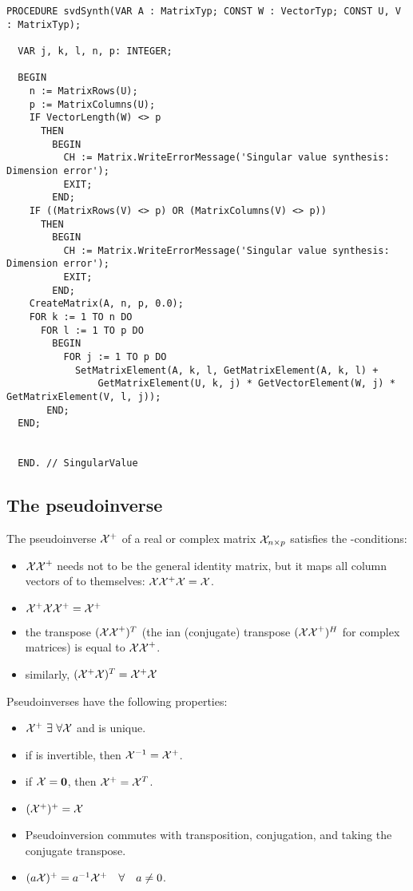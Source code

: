 \begin{lstlisting}[caption={Singular value synthesis}]
  PROCEDURE svdSynth(VAR A : MatrixTyp; CONST W : VectorTyp; CONST U, V : MatrixTyp);

  VAR j, k, l, n, p: INTEGER;

  BEGIN
    n := MatrixRows(U);
    p := MatrixColumns(U);
    IF VectorLength(W) <> p
      THEN
        BEGIN
          CH := Matrix.WriteErrorMessage('Singular value synthesis: Dimension error');
          EXIT;
        END;
    IF ((MatrixRows(V) <> p) OR (MatrixColumns(V) <> p))
      THEN
        BEGIN
          CH := Matrix.WriteErrorMessage('Singular value synthesis: Dimension error');
          EXIT;
        END;
    CreateMatrix(A, n, p, 0.0);
    FOR k := 1 TO n DO
      FOR l := 1 TO p DO
        BEGIN
          FOR j := 1 TO p DO
            SetMatrixElement(A, k, l, GetMatrixElement(A, k, l) +
                GetMatrixElement(U, k, j) * GetVectorElement(W, j) * GetMatrixElement(V, l, j));
       END;
  END;


  END. // SingularValue
\end{lstlisting}

\subsection{The  pseudoinverse}\label{text:pseudoinv}

The pseudoinverse \(\mathcal{X}^+ \) of a real or complex matrix \(\mathcal{X}_{n\times p} \) satisfies the -conditions:
\begin{itemize}
  \item{\( \mathcal{XX}^+ \) needs not to be the general identity matrix, but it maps all column vectors of  to themselves: \(\mathcal{X} \mathcal{X}^+ \mathcal{X} = \mathcal{X} \).}
  \item{\( \mathcal{X}^+ \mathcal{X} \mathcal{X}^+ = \mathcal{X}^+ \)}
  \item{the transpose \((\mathcal{XX}^+)^T \) (the ian (conjugate) transpose \((\mathcal{XX}^+)^H \) for complex matrices) is equal to \(\mathcal{XX}^+ \).}
  \item{similarly, \((\mathcal{X}^+\mathcal{X})^T = \mathcal{X}^+\mathcal{X} \)}
\end{itemize}
Pseudoinverses have the following properties:
\begin{itemize}
  \item{\( \mathcal{X}^+ \ \exists \ \forall \mathcal{X} \) and is unique.}
  \item{if  is invertible, then \(\mathcal{X}^{-1} = \mathcal{X}^+ \). }
  \item{if \(\mathcal{X} = \mathbf{0} \), then \(\mathcal{X}^+ = \mathcal{X}^T \). }
  \item{\( (\mathcal{X}^+)^+ = \mathcal{X} \)}
  \item{Pseudoinversion commutes with transposition, conjugation, and taking the conjugate transpose.}
  \item{\( (a\mathcal{X})^+ = a^{-1} \mathcal{X}^+ \quad \forall \quad a \neq 0 \). }
\end{itemize}

